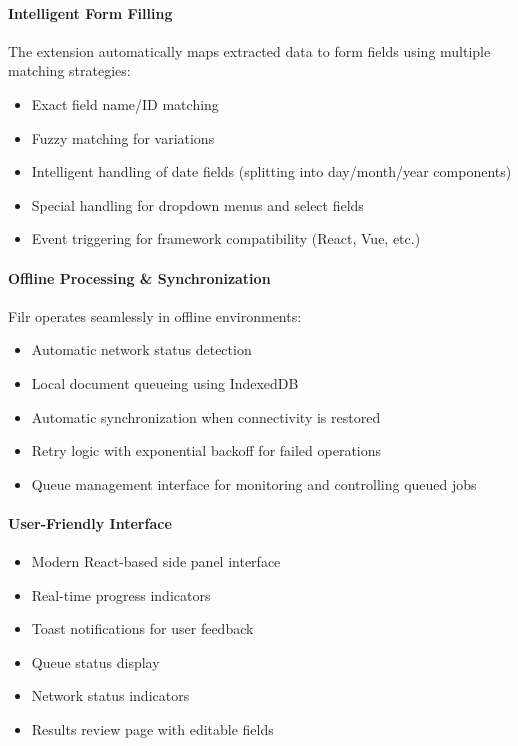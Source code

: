 \documentclass[11pt, a4paper]{article}
\theoremstyle{plain}
\theoremstyle{definition}
\begin{document}
\paragraph{Intelligent Form Filling}
The extension automatically maps extracted data to form fields using multiple matching strategies:
\begin{itemize}
    \item Exact field name/ID matching
    \item Fuzzy matching for variations
    \item Intelligent handling of date fields (splitting into day/month/year components)
    \item Special handling for dropdown menus and select fields
    \item Event triggering for framework compatibility (React, Vue, etc.)
\end{itemize}

\paragraph{Offline Processing \& Synchronization}
Filr operates seamlessly in offline environments:
\begin{itemize}
    \item Automatic network status detection
    \item Local document queueing using IndexedDB
    \item Automatic synchronization when connectivity is restored
    \item Retry logic with exponential backoff for failed operations
    \item Queue management interface for monitoring and controlling queued jobs
\end{itemize}

\paragraph{User-Friendly Interface}
\begin{itemize}
    \item Modern React-based side panel interface
    \item Real-time progress indicators
    \item Toast notifications for user feedback
    \item Queue status display
    \item Network status indicators
    \item Results review page with editable fields
\end{itemize}
\end{document}

